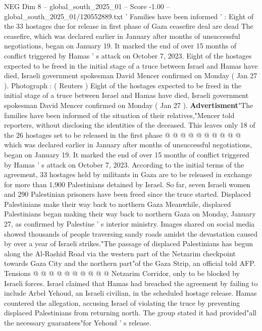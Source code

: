 \begin{textsample}{NEG Dim 8 – global\_south\_2025\_01 – Score -1.00 – global\_south\_2025\_01/120552889.txt}  \label{ex:f8_neg_137}
' Families have been informed ' : Eight of the 33 hostages due for release in first phase of Gaza ceasefire deal are dead The ceasefire, which was declared earlier in January after months of unsuccessful negotiations, began on January 19.
It marked the end of over 15 months of conflict triggered by Hamas ' s attack on October 7, 2023.
Eight of the hostages expected to be freed in the initial stage of a truce between Israel and Hamas have died, Israeli government spokesman David Mencer confirmed on Monday ( Jan 27 ).
Photograph : ( Reuters ) Eight of the hostages expected to be freed in the initial stage of a truce between Israel and Hamas have died, Israeli government spokesman David Mencer confirmed on Monday ( Jan 27 ). \textbf{Advertisment}"The families have been informed of the situation of their relatives,"Mencer told reporters, without disclosing the identities of the deceased.
This leaves only 18 of the 26 hostages set to be released in the first phase @ @ @ @ @ @ @ @ @ @ which was declared earlier in January after months of unsuccessful negotiations, began on January 19.
It marked the end of over 15 months of conflict triggered by Hamas ' s attack on October 7, 2023.
According to the initial terms of the agreement, 33 hostages held by militants in Gaza are to be released in exchange for more than 1,900 Palestinians detained by Israel.
So far, seven Israeli women and 290 Palestinian prisoners have been freed since the truce started.
Displaced Palestinians make their way back to northern Gaza Meanwhile, displaced Palestinians began making their way back to northern Gaza on Monday, January 27, as confirmed by Palestine ' s interior ministry.
Images shared on social media showed thousands of people traversing sandy roads amidst the devastation caused by over a year of Israeli strikes."The passage of displaced Palestinians has begun along the Al-Rashid Road via the western part of the Netzarim checkpoint towards Gaza City and the northern part"of the Gaza Strip, an official told AFP.
Tensions @ @ @ @ @ @ @ @ @ @ Netzarim Corridor, only to be blocked by Israeli forces.
Israel claimed that Hamas had breached the agreement by failing to include Arbel Yehoud, an Israeli civilian, in the scheduled hostage release.
Hamas countered the allegation, accusing Israel of violating the truce by preventing displaced Palestinians from returning north.
The group stated it had provided"all the necessary guarantees"for Yehoud ' s release.

\end{textsample}
